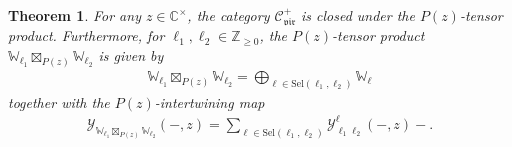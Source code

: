 \documentclass[10pt,a4paper]{amsart}
\numberwithin{equation}{section}
\newtheorem{thm}{Theorem}[section]
\newcommand{\bC}{\mathbb{C}}
\newcommand{\bZ}{\mathbb{Z}}
\newcommand{\cC}{\mathcal{C}}
\newcommand{\catVir}{\cC_{\vir}}
\newcommand{\Sel}{\mathrm{Sel}}
\newcommand{\voaint}{\mathcal{Y}}
\newcommand{\virmod}{\mathbb{W}}
\newcommand{\vir}{\mathfrak{vir}}
\begin{document}
\begin{thm}
For any $z\in \bC^{\times}$, the category $\catVir^{+}$ is closed under the $P(z)$-tensor product.
Furthermore, for $\ell_{1},\ell_{2}\in\bZ_{\geq 0}$, the $P(z)$-tensor product $\virmod_{\ell_{1}}\boxtimes_{P(z)}\virmod_{\ell_{2}}$ is given by
\begin{gather}
\label{eq:Pz-tensor_frmods}
 \virmod_{\ell_{1}}\boxtimes_{P(z)}\virmod_{\ell_{2}}=\bigoplus_{\ell\in\Sel (\ell_{1},\ell_{2})}\virmod_{\ell}
\end{gather}
together with the $P(z)$-intertwining map
\begin{gather}
\label{eq:Pz-intmap_frmods}
 \voaint_{\virmod_{\ell_{1}}\boxtimes_{P(z)}\virmod_{\ell_{2}}}(-,z)=\sum_{\ell\in\Sel (\ell_{1},\ell_{2})}\voaint_{\ell_{1} \ell_{2}}^{\ell}(-,z)-.
\end{gather}
\end{thm}
\end{document}
